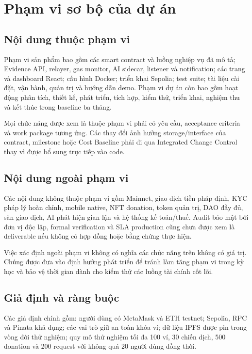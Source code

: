 \iffalse
\section{Phạm vi sơ bộ của dự án}

\subsection{Nội dung thuộc phạm vi}

Phạm vi sản phẩm bao gồm các smart contract và luồng nghiệp vụ đã mô tả; Evidence API, relayer, gas monitor, AI sidecar, listener và notification; các trang và dashboard React; cấu hình Docker; triển khai Sepolia; test suite; tài liệu cài đặt, vận hành, quản trị và hướng dẫn demo. Phạm vi dự án còn bao gồm hoạt động phân tích, thiết kế, phát triển, tích hợp, kiểm thử, triển khai, nghiệm thu và kết thúc trong baseline ba tháng.

Mọi chức năng được xem là thuộc phạm vi phải có yêu cầu, acceptance criteria và work package tương ứng. Các thay đổi ảnh hưởng storage/interface của contract, milestone hoặc Cost Baseline phải đi qua Integrated Change Control thay vì được bổ sung trực tiếp vào code.

\subsection{Nội dung ngoài phạm vi}

Các nội dung không thuộc phạm vi gồm Mainnet, giao dịch tiền pháp định, KYC pháp lý hoàn chỉnh, mobile native, NFT donation, token quản trị, DAO đầy đủ, sàn giao dịch, AI phát hiện gian lận và hệ thống kế toán/thuế. Audit bảo mật bởi đơn vị độc lập, formal verification và SLA production cũng chưa được xem là deliverable nếu không có hợp đồng hoặc bằng chứng thực hiện.

Việc xác định ngoài phạm vi không có nghĩa các chức năng trên không có giá trị. Chúng được đưa vào định hướng phát triển để tránh làm tăng phạm vi trong kỳ học và bảo vệ thời gian dành cho kiểm thử các luồng tài chính cốt lõi.

\subsection{Giả định và ràng buộc}

Các giả định chính gồm: người dùng có MetaMask và ETH testnet; Sepolia, RPC và Pinata khả dụng; các vai trò giữ an toàn khóa ví; dữ liệu IPFS được pin trong vòng đời thử nghiệm; quy mô thử nghiệm tối đa 100 ví, 30 chiến dịch, 500 donation và 200 request với không quá 20 người dùng đồng thời.

